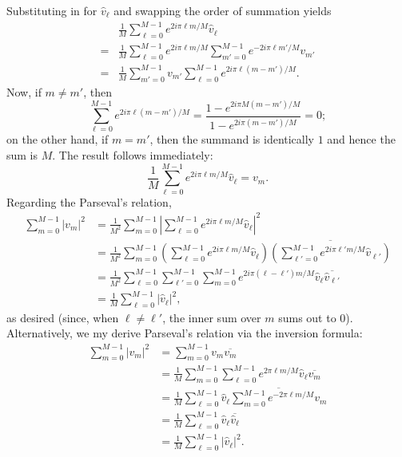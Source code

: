 \documentclass{article}
\providecommand{\abs}[1]{\left\lvert#1\right\rvert}
\begin{document}
\begin{itemize}
Substituting in for $\hat{v}_{\ell}$ and swapping the order of summation yields
\begin{align*}
  & \frac{1}{M} \sum_{\ell=0}^{M-1} e^{2i\pi\ell m/M} \hat{v}_{\ell} \\
= & \frac{1}{M} \sum_{\ell=0}^{M-1} e^{2i\pi\ell m/M} \sum_{m'=0}^{M-1} e^{-2i\pi\ell m'/M} v_{m'} \\
= & \frac{1}{M} \sum_{m'=0}^{M-1} v_{m'} \sum_{\ell=0}^{M-1} e^{2i\pi\ell \left( m - m' \right) / M}.
\end{align*}
Now, if $m \neq m'$, then
\begin{equation*}
\sum_{\ell=0}^{M-1} e^{2i\pi\ell \left( m - m' \right) /M} = \frac{1 - e^{2i\pi M \left( m - m' \right) /M}}{1 - e^{2i\pi \left( m - m' \right) /M}} = 0;
\end{equation*}
on the other hand, if $m = m'$, then the summand is identically $1$ and hence the sum is $M$. The result follows immediately:
\begin{equation*}
\frac{1}{M} \sum_{\ell=0}^{M-1} e^{2i\pi\ell m/M} \hat{v}_{\ell} = v_m.
\end{equation*}
Regarding the Parseval's relation,
\begin{align*}
\sum_{m=0}^{M-1} \abs{v_m}^2
& = \frac{1}{M^2} \sum_{m=0}^{M-1} \abs{\sum_{\ell=0}^{M-1} e^{2i\pi\ell m/M} \hat{v}_{\ell}}^2 \\
& = \frac{1}{M^2} \sum_{m=0}^{M-1} \left( \sum_{\ell=0}^{M-1} e^{2i\pi\ell m/M} \hat{v}_{\ell} \right) \overline{\left( \sum_{\ell'=0}^{M-1} e^{2i\pi\ell'm/M} \hat{v}_{\ell'} \right)} \\
& = \frac{1}{M^2} \sum_{\ell=0}^{M-1} \sum_{\ell'=0}^{M-1} \sum_{m=0}^{M-1} e^{2i\pi \left( \ell - \ell' \right) m/M} \hat{v}_{\ell} \overline{\hat{v}_{\ell'}} \\
& = \frac{1}{M} \sum_{\ell=0}^{M-1} \abs{\hat{v}_{\ell}}^2,
\end{align*}
as desired (since, when $\ell \neq \ell'$, the inner sum over $m$ sums out to $0$). Alternatively, we my derive Parseval's relation via the inversion formula:
\begin{align*}
\sum_{m=0}^{M-1} \abs{v_m}^2
& = \sum_{m=0}^{M-1} v_m \overline{v_m} \\
& = \frac{1}{M} \sum_{m=0}^{M-1} \sum_{\ell=0}^{M-1} e^{2\pi\ell m/M} \hat{v}_{\ell} \overline{v_m} \\
& = \frac{1}{M} \sum_{\ell=0}^{M-1} \hat{v}_{\ell} \overline{\sum_{m=0}^{M-1} e^{-2\pi\ell m/M} v_m} \\
& = \frac{1}{M} \sum_{\ell=0}^{M-1} \hat{v}_{\ell} \overline{\hat{v}_{\ell}} \\
& = \frac{1}{M} \sum_{\ell=0}^{M-1} \abs{\hat{v}_{\ell}}^2.
\end{align*}


\end{itemize}
\end{document}
